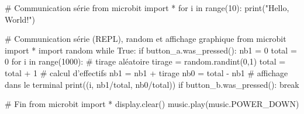 # Communication série
from microbit import *
for i in range(10):
    print("Hello, World!")


# Communication série (REPL), random et affichage graphique
from microbit import *
import random
while True:
    if button_a.was_pressed():        
        nb1 = 0
        total = 0
        for i in range(1000):
            # tirage aléatoire
            tirage = random.randint(0,1)
            total = total + 1
            # calcul d'effectifs
            nb1 = nb1 + tirage
            nb0 = total - nb1
            # affichage dans le terminal
            print((i, nb1/total, nb0/total))
    if button_b.was_pressed():
        break



# Fin
from microbit import *
display.clear()
music.play(music.POWER_DOWN)